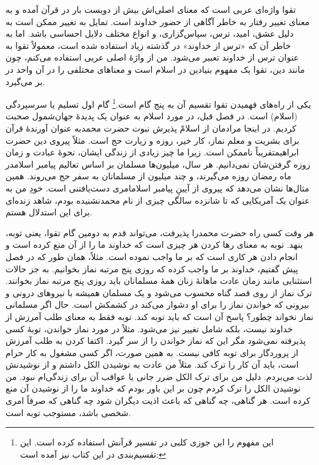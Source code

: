 تقوا واژه‌ای عربی است که معنای اصلی‌اش بیش از دویست بار در قرآن آمده و به معنای تغییر رفتار به خاطر آگاهی از حضور خداوند است. تمایل به تغییر ممکن است به دلیل عشق، امید، ترس، سپاس‌گزاری، و انواع مختلف دلایل احساسی باشد. اما به خاطر آن که «ترس از خداوند» در گذشته زیاد استفاده شده است، معمولاً تقوا به عنوان ترس از خداوند تعبیر می‌شود. من از واژهٔ اصلی عربی استفاده می‌کنم، چون مانند دین، تقوا یک مفهوم بنیادین در اسلام است و معناهای مختلفی را در آن واحد در بر می‌گیرد.

یکی از راه‌های فهمیدن تقوا تقسیم آن به پنج گام است.\footnote{این مفهوم را ابن جوزی کلبی در تفسیر قرآنش استفاده کرده است. این تقسیم‌بندی در این کتاب نیز آمده است:
	
	}
گام اول تسلیم یا سرسپردگی (اسلام) است. در فصل قبل، در مورد اسلام به عنوان یک پدیدهٔ جهان‌شمول صحبت کردیم. در اینجا مرادمان از اسلامْ پذیرش نبوت حضرت محمد{}به عنوان آورندهٔ قرآن برای بشریت و معلم نماز، کار خیر، روزه و زیارت حج است. مثلاً پیروی دین حضرت ابراهیم{}تقریباً ناممکن است. زیرا ما چیز زیادی از زندگی ایشان، نحوهٔ عبادت و زمان روزه گرفتن‌شان نمی‌دانیم. هر سال، میلیون‌ها مسلمان بر اساس تعالیم پیامبر اسلام{}در ماه رمضان روزه می‌گیرند، و چند میلیون از مسلمانان به سفر حج می‌روند. همین مثال‌ها نشان می‌دهد که پیروی از آیینِ پیامبر اسلام{}امری دست‌یافتنی است. خودِ من به عنوان یک آمریکایی که تا شانزده سالگی چیزی از نام محمد{}نشنیده بودم، شاهد زنده‌ای برای این استدلال هستم.

هر وقت کسی راه حضرت محمد{}را پذیرفت، می‌تواند قدم به دومین گام تقوا، یعنی توبه، بنهد. توبه به معنای رها کردن هر چیزی است که خداوند ما را از آن منع کرده است و انجام دادن هر کاری است که بر ما واجب نموده است. مثلاً، همان طور که در فصل پیش گفتیم، خداوند بر ما واجب کرده که روزی پنج مرتبه نماز بخوانیم. به جز حالات استثنایی مانند زمان عادت ماهانهٔ زنان همهٔ مسلمانان باید روزی پنج مرتبه نماز بخوانند. ترک نماز از روی قصد گناه محسوب می‌شود و یک مسلمان همیشه با نیروهای درونی و بیرونی که خواندن نماز را برای او دشوار می‌کند در کشمکش است. حال اگر مسلمانی نماز نخواند چطور؟ پاسخ آن است که باید توبه کند. توبه فقط به معنای طلب آمرزش از خداوند نیست، بلکه شامل تغییر نیز می‌شود. مثلاً در مورد نماز خواندن، توبهٔ کسی پذیرفته نمی‌شود مگر این که  نماز خواندن را از سر گیرد. اکتفا کردن به طلب آمرزش از پروردگار برای توبه کافی نیست. به همین صورت، اگر کسی مشغول به کار حرام است، باید آن کار را ترک کند. مثلاً من عادت به نوشیدن الکل داشتم و از نوشیدنش لذت می‌بردم. دلیل من برای ترک الکل ضرر جانی یا عواقب آن برای زندگی‌ام نبود. من نوشیدن الکل را ترک کردم چون بر این باور بودم که خداوند ما را از نوشیدن آن منع کرده است. هر گناهی، چه گناهی که باعث اذیت دیگران شود چه گناهی که صرفاً امری شخصی باشد، مستوجب توبه است.

